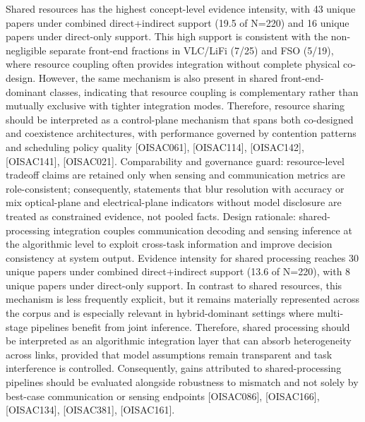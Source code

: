 {}Shared resources has the highest concept-level evidence intensity, with 43 unique papers under combined direct+indirect support (19.5\markdownRendererPercentSign{} of N=220) and 16 unique papers under direct-only support. This high support is consistent with the non-negligible separate front-end fractions in VLC/LiFi (7/25) and FSO (5/19), where resource coupling often provides integration without complete physical co-design. However, the same mechanism is also present in shared front-end-dominant classes, indicating that resource coupling is complementary rather than mutually exclusive with tighter integration modes. Therefore, resource sharing should be interpreted as a control-plane mechanism that spans both co-designed and coexistence architectures, with performance governed by contention patterns and scheduling policy quality [O\markdownRendererUnderscore{}ISAC\markdownRendererUnderscore{}061], [O\markdownRendererUnderscore{}ISAC\markdownRendererUnderscore{}114], [O\markdownRendererUnderscore{}ISAC\markdownRendererUnderscore{}142], [O\markdownRendererUnderscore{}ISAC\markdownRendererUnderscore{}141], [O\markdownRendererUnderscore{}ISAC\markdownRendererUnderscore{}021].\markdownRendererParagraphSeparator
{}Comparability and governance guard: resource-level tradeoff claims are retained only when sensing and communication metrics are role-consistent; consequently, statements that blur resolution with accuracy or mix optical-plane and electrical-plane indicators without model disclosure are treated as constrained evidence, not pooled facts.\markdownRendererInterblockSeparator
{}
\markdownRendererSectionEnd \markdownRendererSectionBegin
{}\markdownRendererInterblockSeparator
{}Design rationale: shared-processing integration couples communication decoding and sensing inference at the algorithmic level to exploit cross-task information and improve decision consistency at system output.\markdownRendererParagraphSeparator
{}Evidence intensity for shared processing reaches 30 unique papers under combined direct+indirect support (13.6\markdownRendererPercentSign{} of N=220), with 8 unique papers under direct-only support. In contrast to shared resources, this mechanism is less frequently explicit, but it remains materially represented across the corpus and is especially relevant in hybrid-dominant settings where multi-stage pipelines benefit from joint inference. Therefore, shared processing should be interpreted as an algorithmic integration layer that can absorb heterogeneity across links, provided that model assumptions remain transparent and task interference is controlled. Consequently, gains attributed to shared-processing pipelines should be evaluated alongside robustness to mismatch and not solely by best-case communication or sensing endpoints [O\markdownRendererUnderscore{}ISAC\markdownRendererUnderscore{}086], [O\markdownRendererUnderscore{}ISAC\markdownRendererUnderscore{}166], [O\markdownRendererUnderscore{}ISAC\markdownRendererUnderscore{}134], [O\markdownRendererUnderscore{}ISAC\markdownRendererUnderscore{}381], [O\markdownRendererUnderscore{}ISAC\markdownRendererUnderscore{}161].\markdownRendererParagraphSeparator
